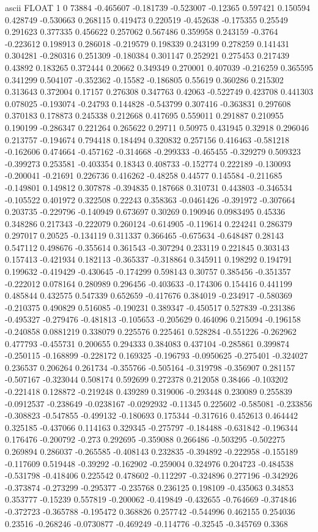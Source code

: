 ascii
FLOAT
1
0 73884 -0.465607 -0.181739 -0.523007 -0.12365 0.597421 0.150594 0.428749 -0.530663 0.268115 0.419473 0.220519 -0.452638 -0.175355 0.25549 0.291623 0.377335 0.456622 0.257062 0.567486 0.359958 0.243159 -0.3764 -0.223612 0.198913 0.286018 -0.219579 0.198339 0.243199 0.278259 0.141431 0.304281 -0.280316 0.251309 -0.180384 0.301147 0.252921 0.275453 0.217439 0.43892 0.183265 0.372444 0.20662 0.349349 0.270001 0.407039 -0.216259 0.365595 0.341299 0.504107 -0.352362 -0.15582 -0.186805 0.55619 0.360286 0.215302 0.313643 0.372004 0.17157 0.276308 0.347763 0.42063 -0.522749 0.423708 0.441303 0.078025 -0.193074 -0.24793 0.144828 -0.543799 0.307416 -0.363831 0.297608 0.370183 0.178873 0.245338 0.212668 0.417695 0.559011 0.291887 0.210955 0.190199 -0.286347 0.221264 0.265622 0.29711 0.50975 0.431945 0.32918 0.296046 0.213757 -0.194674 0.794418 0.184494 0.320832 0.257156 0.416463 -0.581218 -0.162606 0.474664 -0.457162 -0.314668 -0.299333 -0.465455 -0.329279 0.509323 -0.399273 0.253581 -0.403354 0.18343 0.408733 -0.152774 0.222189 -0.130093 -0.200041 -0.21691 0.226736 0.416262 -0.48258 0.44577 0.145584 -0.211685 -0.149801 0.149812 0.307878 -0.394835 0.187668 0.310731 0.443803 -0.346534 -0.105522 0.401972 0.322508 0.22243 0.358363 -0.0461426 -0.391972 -0.307664 0.203735 -0.229796 -0.140949 0.673697 0.30269 0.190946 0.0983495 0.45336 0.348286 0.217343 -0.222079 0.260124 -0.614905 -0.119614 0.224241 0.286379 0.297017 0.20525 -0.134119 0.311337 0.366465 -0.675634 -0.648487 0.28143 0.547112 0.498676 -0.355614 0.361543 -0.307294 0.233119 0.221845 0.303143 0.157413 -0.421934 0.182113 -0.365337 -0.318864 0.345911 0.198292 0.194791 0.199632 -0.419429 -0.430645 -0.174299 0.598143 0.30757 0.385456 -0.351357 -0.222012 0.078164 0.280989 0.296456 -0.403633 -0.174306 0.154416 0.441199 0.485844 0.432575 0.547339 0.652659 -0.417676 0.384019 -0.234917 -0.580369 -0.210375 0.490829 0.516085 -0.190231 0.389347 -0.450517 0.527839 -0.231386 -0.495327 -0.279476 -0.481813 -0.105653 -0.205629 0.464096 0.215094 -0.196158 -0.240858 0.0881219 0.338079 0.225576 0.225461 0.528284 -0.551226 -0.262962 0.477793 -0.455731 0.200655 0.294333 0.384083 0.437104 -0.285861 0.399874 -0.250115 -0.168899 -0.228172 0.169325 -0.196793 -0.0950625 -0.275401 -0.324027 0.236537 0.206264 0.261734 -0.355766 -0.505164 -0.319798 -0.356907 0.281157 -0.507167 -0.323044 0.508174 0.592699 0.272378 0.212058 0.38466 -0.103202 -0.221418 0.128872 -0.219248 0.439289 0.319006 -0.293448 0.230089 0.255839 -0.0912537 -0.238649 -0.0238167 -0.0292932 -0.11345 0.225602 -0.585081 -0.233856 -0.308823 -0.547855 -0.499132 -0.180693 0.175344 -0.317616 0.452613 0.464442 0.325185 -0.437066 0.114163 0.329345 -0.275797 -0.184488 -0.631842 -0.196344 0.176476 -0.200792 -0.273 0.292695 -0.359088 0.266486 -0.503295 -0.502275 0.269894 0.286037 -0.265585 -0.408143 0.232835 -0.394892 -0.222958 -0.155189 -0.117609 0.519448 -0.39292 -0.162902 -0.259004 0.324976 0.204723 -0.484538 -0.531798 -0.418406 0.225542 0.478602 -0.112297 -0.324896 0.277196 -0.342926 -0.373874 -0.273299 -0.295377 -0.235768 0.236125 0.198109 -0.435063 0.34853 0.353777 -0.15239 0.557819 -0.200062 -0.419849 -0.432655 -0.764669 -0.374846 -0.372723 -0.365788 -0.195472 0.368826 0.257742 -0.544996 0.462155 0.254036 0.23516 -0.268246 -0.0730877 -0.469249 -0.114776 -0.32545 -0.345769 0.3368 